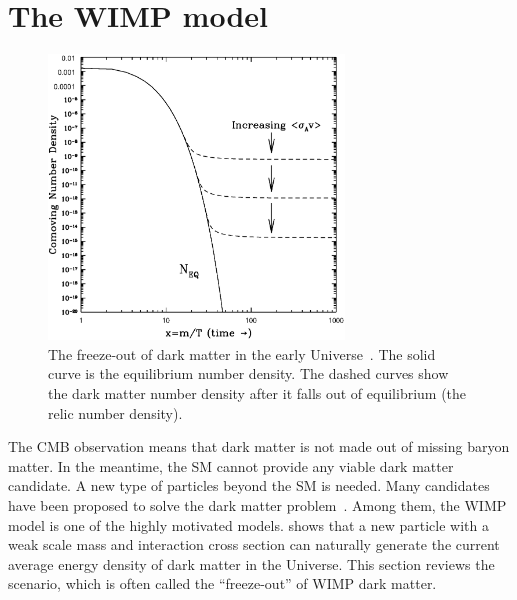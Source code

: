 \documentclass[doublespace,nopageskip]{VTthesis} %
\begin{document}
\section{The WIMP model}\label{se:wimp}

\begin{figure}[htb]
    \centering
    \includegraphics[width=0.7\textwidth]{Figures/Intro/freezeout.ps}
    \caption{The freeze-out of dark matter in the early Universe~\cite{2009arXiv0901.4090H}. The solid curve is the equilibrium number density. The dashed curves show the dark matter number density after it falls out of equilibrium (the relic number density).}
    \label{fig:freeze-out}
\end{figure}

The CMB observation means that dark matter is not made out of missing baryon matter. In the meantime, the SM cannot provide any viable dark matter candidate. A new type of particles beyond the SM is needed.  Many candidates have been proposed to solve the dark matter problem~\cite{2005PhR...405..279B}. Among them, the WIMP model is one of the highly motivated models. \citet{1979ARNPS..29..313S} shows that a new particle with a weak scale mass and interaction cross section can naturally generate the current average energy density of dark matter in the Universe. This section reviews the scenario, which is often called the ``freeze-out'' of WIMP dark matter.
\end{document}
